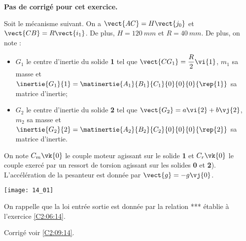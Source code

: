 \normaltrue \difficilefalse \tdifficilefalse
\correctionfalse


\setcounter{question}{0}
\ifcorrection
\else
\textbf{Pas de corrigé pour cet exercice.}
\fi

\ifprof
\else
Soit le mécanisme suivant. On a $\vect{AC}=H\vect{j_0}$ et $\vect{CB}=R\vect{i_1}$. De plus, 
$H=\SI{120}{mm}$ et $R=\SI{40}{mm}$. De plus, on note :
\begin{itemize}
\item $G_1$ le centre d'inertie du solide \textbf{1} tel que $\vect{CG_1}=\dfrac{R}{2} \vi{1}$, $m_1$ sa masse et $\inertie{G_1}{1}=\matinertie{A_1}{B_1}{C_1}{0}{0}{0}{\rep{1}}$ sa matrice d'inertie;
\item $G_2$ le centre d'inertie du solide \textbf{2} tel que $\vect{G_2}=a \vi{2}+b\vj{2}$, $m_2$ sa masse et $\inertie{G_2}{2}=\matinertie{A_2}{B_2}{C_2}{0}{0}{0}{\rep{2}}$ sa matrice d'inertie.
\end{itemize}
On note $C_m\vk{0}$ le couple moteur agissant sur le solide \textbf{1} et $C_r\vk{0}$ le couple exercé par un ressort de torsion agissant sur les solides \textbf{0} et \textbf{2}). L'accélération de la pesanteur est donnée par $\vect{g}=-g\vj{0}$.

\begin{center}
\texttt{[image: 14\_01]}
\end{center}
\fi

On rappelle que la loi entrée sortie est donnée par la relation *** établie à l'exercice \ref{C2:06:14}.

\ifprof
\else
\fi

\ifprof
\else
\fi

\ifprof
\else
\fi

\ifprof
\else
\fi

\ifprof
\else
\fi

\ifprof
\else
\begin{flushright}
\footnotesize{Corrigé  voir \ref{C2:09:14}.}
\end{flushright}%
\fi